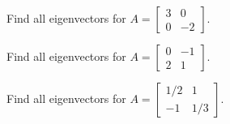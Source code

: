\documentclass[../main.tex]{subfiles}
\begin{document}
\begin{example}
  Find all eigenvectors for \(A = \begin{bmatrix} 3 & 0 \\ 0 & -2 \end{bmatrix}\).

\end{example}
\clearpage

\begin{example}
  Find all eigenvectors for \(A = \begin{bmatrix} 0 & -1 \\ 2 & 1 \end{bmatrix}\).

\end{example}
\clearpage

\begin{example}
  Find all eigenvectors for \(A = \begin{bmatrix} 1/2 & 1 \\ -1 & 1/3 \end{bmatrix}\).

\end{example}
\clearpage
\end{document}
